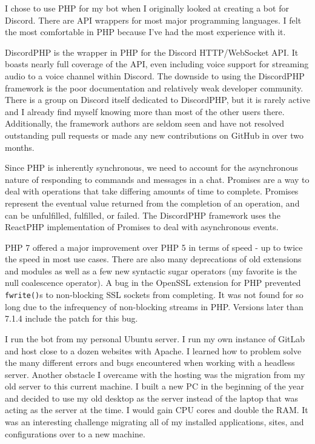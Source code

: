 \documentclass[12pt]{article} %
\begin{document}
I chose to use PHP for my bot when I originally looked at creating a bot for Discord. There are API wrappers for most major programming languages. I felt the most comfortable in PHP because I've had the most experience with it. 

DiscordPHP is the wrapper in PHP for the Discord HTTP/WebSocket API. It boasts nearly full coverage of the API, even including voice support for streaming audio to a voice channel within Discord. The downside to using the DiscordPHP framework is the poor documentation and relatively weak developer community. There is a group on Discord itself dedicated to DiscordPHP, but it is rarely active and I already find myself knowing more than most of the other users there. Additionally, the framework authors are seldom seen and have not resolved outstanding pull requests or made any new contributions on GitHub in over two months.

Since PHP is inherently synchronous, we need to account for the asynchronous nature of responding to commands and messages in a chat. Promises are a way to deal with operations that take differing amounts of time to complete. Promises represent the eventual value returned from the completion of an operation, and can be unfulfilled, fulfilled, or failed. The DiscordPHP framework uses the ReactPHP implementation of Promises to deal with asynchronous events.

PHP 7 offered a major improvement over PHP 5 in terms of speed - up to twice the speed in most use cases. There are also many deprecations of old extensions and modules as well as a few new syntactic sugar operators (my favorite is the null coalescence operator). A bug in the OpenSSL extension for PHP prevented \verb|fwrite()|s to non-blocking SSL sockets from completing. It was not found for so long due to the infrequency of non-blocking streams in PHP. Versions later than 7.1.4 include the patch for this bug.

I run the bot from my personal Ubuntu server. I run my own instance of GitLab and host close to a dozen websites with Apache. I learned how to problem solve the many different errors and bugs encountered when working with a headless server. Another obstacle I overcame with the hosting was the migration from my old server to this current machine. I built a new PC in the beginning of the year and decided to use my old desktop as the server instead of the laptop that was acting as the server at the time. I would gain CPU cores and double the RAM. It was an interesting challenge migrating all of my installed applications, sites, and configurations over to a new machine.
\end{document}
